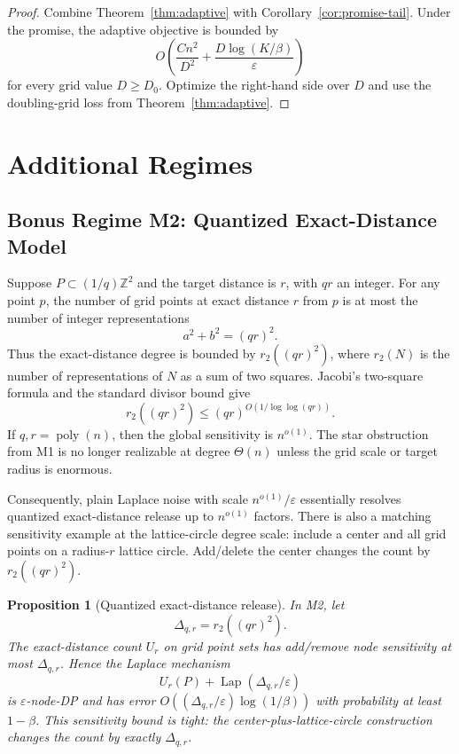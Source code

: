 \documentclass[11pt]{article}
\newtheorem{proposition}[theorem]{Proposition}
\DeclareMathOperator{\Lap}{Lap}
\DeclareMathOperator{\poly}{poly}
\newcommand{\Z}{\mathbb{Z}}
\newcommand{\eps}{\varepsilon}
\begin{document}
\begin{proof}
Combine Theorem~\ref{thm:adaptive} with Corollary~\ref{cor:promise-tail}. Under the promise, the adaptive objective is bounded by
\[
O\!\left(\frac{Cn^2}{D^2}+\frac{D\log(K/\beta)}{\eps}\right)
\]
for every grid value \(D\ge D_0\). Optimize the right-hand side over \(D\) and use the doubling-grid loss from Theorem~\ref{thm:adaptive}.
\end{proof}


\section{Additional Regimes}
\label{sec:additional-regimes}

\subsection{Bonus Regime M2: Quantized Exact-Distance Model}

Suppose \(P\subset (1/q)\Z^2\) and the target distance is \(r\), with \(qr\) an integer. For any point \(p\), the number of grid points at exact distance \(r\) from \(p\) is at most the number of integer representations
\[
a^2+b^2=(qr)^2.
\]
Thus the exact-distance degree is bounded by \(r_2((qr)^2)\), where \(r_2(N)\) is the number of representations of \(N\) as a sum of two squares. Jacobi's two-square formula and the standard divisor bound give~\cite{HardyWright08}
\[
r_2((qr)^2)\le (qr)^{O(1/\log\log(qr))}.
\]
If \(q,r=\poly(n)\), then the global sensitivity is \(n^{o(1)}\). The star obstruction from M1 is no longer realizable at degree \(\Theta(n)\) unless the grid scale or target radius is enormous.

Consequently, plain Laplace noise with scale \(n^{o(1)}/\eps\) essentially resolves quantized exact-distance release up to \(n^{o(1)}\) factors. There is also a matching sensitivity example at the lattice-circle degree scale: include a center and all grid points on a radius-\(r\) lattice circle. Add/delete the center changes the count by \(r_2((qr)^2)\).

\begin{proposition}[Quantized exact-distance release]
\label{prop:m2}
In M2, let
\[
\Delta_{q,r}=r_2((qr)^2).
\]
The exact-distance count \(U_r\) on grid point sets has add/remove node sensitivity at most \(\Delta_{q,r}\). Hence the Laplace mechanism
\[
U_r(P)+\Lap(\Delta_{q,r}/\eps)
\]
is \(\eps\)-node-DP and has error \(O((\Delta_{q,r}/\eps)\log(1/\beta))\) with probability at least \(1-\beta\). This sensitivity bound is tight: the center-plus-lattice-circle construction changes the count by exactly \(\Delta_{q,r}\).
\end{proposition}
\end{document}
